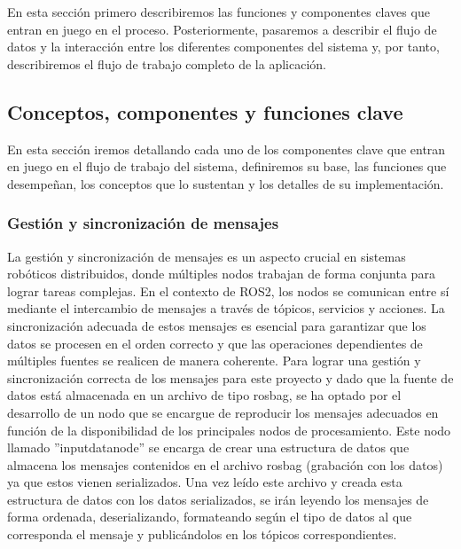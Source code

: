 \documentclass[12pt, a4paper, twoside]{article}
\begin{document}
En esta sección primero describiremos las funciones y componentes claves que entran en juego en el proceso. Posteriormente, pasaremos a 
describir el flujo de datos y la interacción entre los diferentes componentes del sistema y, por tanto, describiremos el flujo de trabajo 
completo de la aplicación.

\subsection{Conceptos, componentes y funciones clave}
En esta sección iremos detallando cada uno de los componentes clave que entran en juego en el flujo de trabajo del sistema, definiremos su base,
las funciones que desempeñan, los conceptos que lo sustentan y los detalles de su implementación.

\subsubsection{Gestión y sincronización de mensajes}
La gestión y sincronización de mensajes es un aspecto crucial en sistemas robóticos distribuidos, donde múltiples nodos trabajan de forma 
conjunta para lograr tareas complejas. En el contexto de ROS2, los nodos se comunican entre sí mediante el intercambio de mensajes a
través de tópicos, servicios y acciones. La sincronización adecuada de estos mensajes es esencial para garantizar que los datos se procesen 
en el orden correcto y que las operaciones dependientes de múltiples fuentes se realicen de manera coherente. \newline
Para lograr una gestión y sincronización correcta de los mensajes para este proyecto y dado que la fuente de datos está almacenada en un 
archivo de tipo rosbag, se ha optado por el desarrollo de un nodo que se encargue de reproducir los mensajes adecuados en función de la disponibilidad 
de los principales nodos de procesamiento.\newline
Este nodo llamado ''input\textunderscore data\textunderscore node'' se encarga de crear una estructura de datos que almacena los mensajes contenidos 
en el archivo rosbag (grabación con los datos) ya que estos vienen serializados. Una vez leído este archivo y creada esta estructura de datos con los 
datos serializados, se irán leyendo los mensajes de forma ordenada, deserializando, formateando según el tipo de datos al que corresponda el mensaje 
y publicándolos en los tópicos correspondientes.
\end{document}
